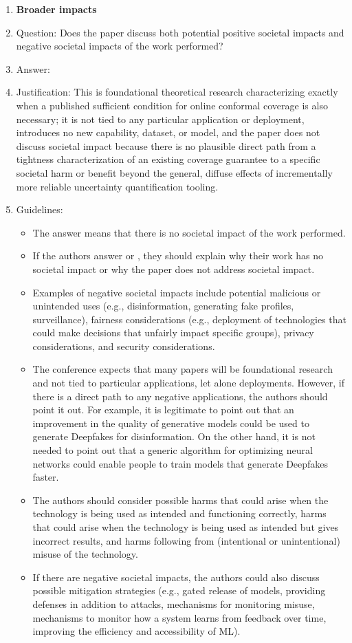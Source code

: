 \begin{enumerate}
\item {\bf Broader impacts}
    \item[] Question: Does the paper discuss both potential positive societal impacts and negative societal impacts of the work performed?
    \item[] Answer: \answerNA{}
    \item[] Justification: This is foundational theoretical research characterizing exactly when a published sufficient condition for online conformal coverage is also necessary; it is not tied to any particular application or deployment, introduces no new capability, dataset, or model, and the paper does not discuss societal impact because there is no plausible direct path from a tightness characterization of an existing coverage guarantee to a specific societal harm or benefit beyond the general, diffuse effects of incrementally more reliable uncertainty quantification tooling.
    \item[] Guidelines:
    \begin{itemize}
        \item The answer \answerNA{} means that there is no societal impact of the work performed.
        \item If the authors answer \answerNA{} or \answerNo, they should explain why their work has no societal impact or why the paper does not address societal impact.
        \item Examples of negative societal impacts include potential malicious or unintended uses (e.g., disinformation, generating fake profiles, surveillance), fairness considerations (e.g., deployment of technologies that could make decisions that unfairly impact specific groups), privacy considerations, and security considerations.
        \item The conference expects that many papers will be foundational research and not tied to particular applications, let alone deployments. However, if there is a direct path to any negative applications, the authors should point it out. For example, it is legitimate to point out that an improvement in the quality of generative models could be used to generate Deepfakes for disinformation. On the other hand, it is not needed to point out that a generic algorithm for optimizing neural networks could enable people to train models that generate Deepfakes faster.
        \item The authors should consider possible harms that could arise when the technology is being used as intended and functioning correctly, harms that could arise when the technology is being used as intended but gives incorrect results, and harms following from (intentional or unintentional) misuse of the technology.
        \item If there are negative societal impacts, the authors could also discuss possible mitigation strategies (e.g., gated release of models, providing defenses in addition to attacks, mechanisms for monitoring misuse, mechanisms to monitor how a system learns from feedback over time, improving the efficiency and accessibility of ML).
    \end{itemize}


\end{enumerate}
